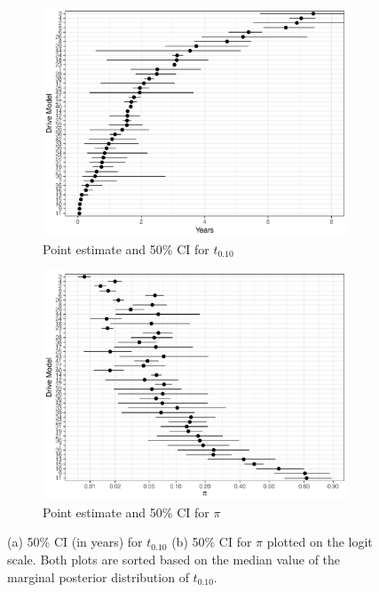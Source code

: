 \documentclass[11pt]{article}
\begin{document}
\begin{figure}[H]
\centering
   \begin{subfigure}[b]{0.80\textwidth}
   \includegraphics[width=1\linewidth]{b10new.pdf}
   \caption{\footnotesize Point estimate and 50\% CI for $t_{0.10}$}
   \label{fig:Ng1} 
\end{subfigure}

\begin{subfigure}[b]{0.80\textwidth}
   \includegraphics[width=1\linewidth]{pinew.pdf}
   \caption{\footnotesize Point estimate and 50\% CI for $\pi$}
   \label{fig:Ng2}
\end{subfigure}

\caption{\footnotesize (a) 50\% CI (in years) for $t_{0.10}$ (b) 50\% CI for $\pi$ plotted on the logit scale.  Both plots are sorted based on the median value of the marginal posterior distribution of $t_{0.10}$.}
\end{figure}
\end{document}
